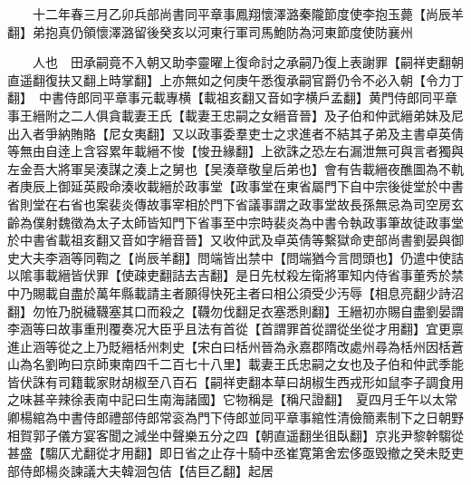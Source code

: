 　　十二年春三月乙卯兵部尚書同平章事鳳翔懷澤潞秦隴節度使李抱玉薨【尚辰羊翻】弟抱真仍領懷澤潞留後癸亥以河東行軍司馬鮑防為河東節度使防襄州

　　人也　田承嗣竟不入朝又助李靈曜上復命討之承嗣乃復上表謝罪【嗣祥吏翻朝直遥翻復扶又翻上時掌翻】上亦無如之何庚午悉復承嗣官爵仍令不必入朝【令力丁翻】　中書侍郎同平章事元載專横【載祖亥翻又音如字横戶孟翻】黄門侍郎同平章事王縉附之二人俱貪載妻王氏【載妻王忠嗣之女縉音晉】及子伯和仲武縉弟妹及尼出入者爭納賄賂【尼女夷翻】又以政事委羣吏士之求進者不結其子弟及主書卓英倩等無由自逹上含容累年載縉不悛【悛丑緣翻】上欲誅之恐左右漏泄無可與言者獨與左金吾大將軍吴湊謀之湊上之舅也【吴湊章敬皇后弟也】會有告載縉夜醮圖為不軌者庚辰上御延英殿命湊收載縉於政事堂【政事堂在東省屬門下自中宗後徙堂於中書省則堂在右省也案裴炎傳故事宰相於門下省議事謂之政事堂故長孫無忌為司空房玄齡為僕射魏徵為太子太師皆知門下省事至中宗時裴炎為中書令執政事筆故徒政事堂於中書省載祖亥翻又音如字縉音晉】又收仲武及卓英倩等繫獄命吏部尚書劉晏與御史大夫李涵等同鞫之【尚辰羊翻】問端皆出禁中【問端猶今言問頭也】仍遣中使詰以隂事載縉皆伏罪【使疎吏翻詰去吉翻】是日先杖殺左衛將軍知内侍省事董秀於禁中乃賜載自盡於萬年縣載請主者願得快死主者曰相公須受少汚辱【相息亮翻少詩沼翻】勿恠乃脱穢韈塞其口而殺之【韈勿伐翻足衣塞悉則翻】王縉初亦賜自盡劉晏謂李涵等曰故事重刑覆奏况大臣乎且法有首從【首謂罪首從謂從坐從才用翻】宜更禀進止涵等從之上乃貶縉栝州刺史【宋白曰栝州晉為永嘉郡隋改處州尋為栝州因栝蒼山為名劉昫曰京師東南四千二百七十八里】載妻王氏忠嗣之女也及子伯和仲武季能皆伏誅有司籍載家財胡椒至八百石【嗣祥吏翻本草曰胡椒生西戎形如鼠李子調食用之味甚辛辣徐表南中記曰生南海諸國】它物稱是【稱尺證翻】　夏四月壬午以太常卿楊綰為中書侍郎禮部侍郎常衮為門下侍郎並同平章事綰性清儉簡素制下之日朝野相賀郭子儀方宴客聞之減坐中聲樂五分之四【朝直遥翻坐徂臥翻】京兆尹黎幹騶從甚盛【騶仄尤翻從才用翻】即日省之止存十騎中丞崔寛第舍宏侈亟毁撤之癸未貶吏部侍郎楊炎諫議大夫韓洄包佶【佶巨乙翻】起居

